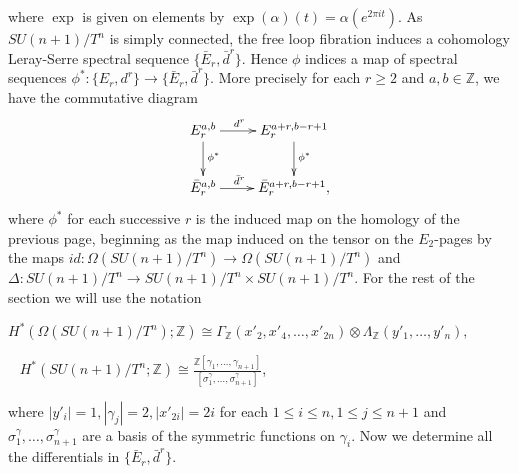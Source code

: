 \documentclass{article}
\theoremstyle{plain}
\theoremstyle{definition}
\numberwithin{thm}{section}
\begin{document}
			where $\exp$ is given on elements by $\exp(\alpha)(t)=\alpha(e^{2\pi i t})$.
			As $SU(n+1)/T^{n}$ is simply connected, the free loop fibration induces a cohomology Leray-Serre spectral sequence $\{ \bar{E}_r,\bar{d}^r \}$.
			Hence $\phi$ indices a map of spectral sequences $\phi^*:\{ E_r,d^r \} \to \{ \bar{E}_r,\bar{d}^r \}$. 
			More precisely for each $r\geq 2$ and $a,b \in \mathbb{Z}$, we have the commutative diagram
			\begin{equation}\label{fig:phicd}
						\xymatrix{
							{E_r^{a,b}} \ar[r]^(.4){d^r} \ar[d]^(.46){\phi^*} & {E_r^{a+r,b-r+1}} \ar[d]^(.46){\phi^*}  \\
							{\bar{E}_r^{a,b}} \ar[r]^(.4){\bar{d}^r}   			& {\bar{E}_r^{a+r,b-r+1}} 	  			 	  ,}
					\end{equation}
			where $\phi^*$ for each successive $r$ is the induced map on the homology of the previous page, beginning as the map induced on the tensor on the $E_2$-pages
			by the maps $id \colon \Omega(SU(n+1)/T^n)\to\Omega(SU(n+1)/T^n)$ and $\Delta \colon SU(n+1)/T^n \to SU(n+1)/T^n \times SU(n+1)/T^n$.
			For the rest of the section we will use the notation
			\begin{center}
			$H^*(\Omega(SU(n+1)/T^n);\mathbb{Z})\cong \Gamma_{\mathbb{Z}}(x'_2,x'_4,\dots,x'_{2n})\otimes\Lambda_{\mathbb{Z}}(y'_1,\dots,y'_{n}),$
			\end{center}
			\begin{center}
			$\;\;\; H^*(SU(n+1)/T^n;\mathbb{Z})\cong \frac{\mathbb{Z}[\gamma_1,\dots,\gamma_{n+1}]}{[\sigma^\gamma_1,\dots,\sigma_{n+1}^\gamma]}$,
			\end{center}
			where $|y'_i|=1, |\gamma_j|=2, |x'_{2i}|=2i$ for each $1\leq i\leq n,1\leq j\leq n+1$ and $\sigma^\gamma_1,\dots,\sigma_{n+1}^\gamma$
			are a basis of the symmetric functions on $\gamma_i$.
			Now we determine all the differentials in $\{ \bar{E}_r,\bar{d}^r \}$.	
			
\end{document}
